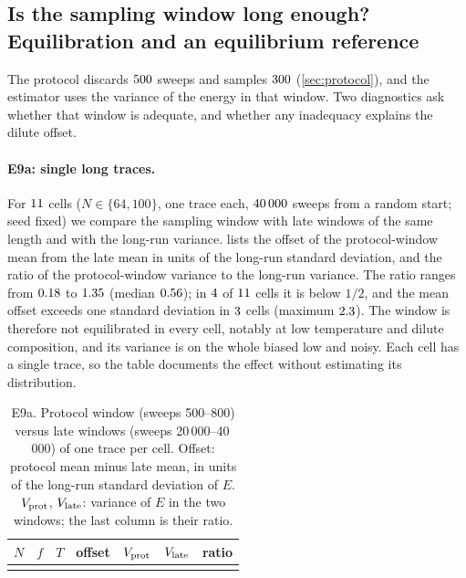 \subsection{Is the sampling window long enough? Equilibration and an equilibrium reference}\label{sec:results-equil}
The protocol discards $500$ sweeps and samples $300$ (\cref{sec:protocol}), and the estimator uses the variance of the energy in that window. Two diagnostics ask whether that window is adequate, and whether any inadequacy explains the dilute offset.

\paragraph{E9a: single long traces.} For $11$ cells ($N\in\{64,100\}$, one trace each, $40\,000$ sweeps from a random start; seed fixed) we compare the sampling window with late windows of the same length and with the long-run variance.  lists the offset of the protocol-window mean from the late mean in units of the long-run standard deviation, and the ratio of the protocol-window variance to the long-run variance. The ratio ranges from $0.18$ to $1.35$ (median $0.56$); in $4$ of $11$ cells it is below $1/2$, and the mean offset exceeds one standard deviation in $3$ cells (maximum $2.3$). The window is therefore not equilibrated in every cell, notably at low temperature and dilute composition, and its variance is on the whole biased low and noisy. Each cell has a single trace, so the table documents the effect without estimating its distribution.

\begin{table}[t]
\centering\small
\caption{E9a. Protocol window (sweeps 500--800) versus late windows (sweeps 20\,000--40\,000) of one trace per cell. Offset: protocol mean minus late mean, in units of the long-run standard deviation of $E$. $V_{\rm prot}$, $V_{\rm late}$: variance of $E$ in the two windows; the last column is their ratio.}\label{tab:E9a}
\begin{tabular}{rrrrrrr}
\toprule
$N$ & $f$ & $T$ & offset & $V_{\rm prot}$ & $V_{\rm late}$ & ratio\\
\midrule
\\
\bottomrule
\end{tabular}
\end{table}

